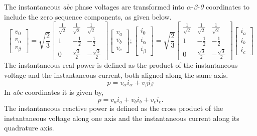 The instantaneous \textit{abc} phase voltages are transformed into $\alpha$-$\beta$-\textit{0} coordinates to include the zero sequence components, as given below.
\begin{equation}
\begin{bmatrix} v_0 \\ v_\alpha \\ v_\beta
\end{bmatrix}= \sqrt{\frac{2}{3}}\begin{bmatrix} \frac{1}{\sqrt{2}}& \frac{1}{\sqrt{2}} & \frac{1}{\sqrt{2}} \\ 1 & -\frac{1}{2} & -\frac{1}{2} \\
0 & \frac{\sqrt{3}}{2} & -\frac{\sqrt{3}}{2}
\end{bmatrix} \begin{bmatrix} v_a  \\
v_b \\ v_c
\end{bmatrix} ; 
\begin{bmatrix} i_0 \\ i_\alpha \\ i_\beta
\end{bmatrix}= \sqrt{\frac{2}{3}}\begin{bmatrix} \frac{1}{\sqrt{2}}& \frac{1}{\sqrt{2}} & \frac{1}{\sqrt{2}} \\ 1 & -\frac{1}{2} & -\frac{1}{2} \\
0 & \frac{\sqrt{3}}{2} & -\frac{\sqrt{3}}{2}
\end{bmatrix} \begin{bmatrix} i_a  \\
i_b \\ i_c
\end{bmatrix}
\label{eqn2.1}
\end{equation}
The instantaneous real power is defined as the product of the instantaneous voltage and the instantaneous current, both aligned along the same axis. \vspace*{-0.5cm}
\begin{equation}
p=v_\alpha i_\alpha + v_\beta i_\beta
\label{eqn2.2}
\end{equation} %
In \textit{abc} coordinates it is given by, \vspace*{-0.5cm} 
\begin{equation*}
p=v_a i_a + v_b i_b + v_c i_c.
\end{equation*}
The instantaneous reactive power is defined as the cross product of the instantaneous voltage along one axis and the instantaneous current along its quadrature axis. 
